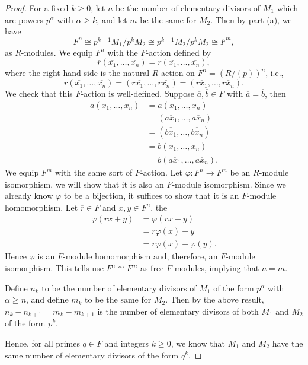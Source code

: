 \documentclass[12pt]{article}
\theoremstyle{definition}
\renewcommand{\phi}{\varphi}
\newcommand{\isom}{\cong}
\newcommand{\eqc}{\overline}
\begin{document}
\begin{proof}
    For a fixed $k \geq 0$, let $n$ be the number of elementary divisors of $M_1$ which are powers $p^\alpha$ with $\alpha \geq k$, and let $m$ be the same for $M_2$. Then by part (a), we have
    \[
        F^n \isom p^{k-1}M_1/p^kM_2 \isom p^{k-1}M_2/p^kM_2 \isom F^m,
    \]
    as $R$-modules. We equip $F^n$ with the $F$-action defined by
    \[
        \eqc{r}(\eqc{x_1}, \dots, \eqc{x_n}) = r(\eqc{x_1}, \dots, \eqc{x_n}),
    \]
    where the right-hand side is the natural $R$-action on $F^n = (R/(p))^n$, i.e.,
    \[
        r(\eqc{x_1}, \dots, \eqc{x_n})
            = (r\eqc{x_1}, \dots, r\eqc{x_n})
            = (\eqc{rx_1}, \dots, \eqc{rx_n}).
    \]
    We check that this $F$-action is well-defined. Suppose $\eqc{a}, \eqc{b} \in F$ with $\eqc{a} = \eqc{b}$, then
    \begin{align*}
        \eqc{a}(\eqc{x_1}, \dots, \eqc{x_n})
            &= a(\eqc{x_1}, \dots, \eqc{x_n}) \\
            &= (\eqc{ax_1}, \dots, \eqc{ax_n}) \\
            &= (\eqc{bx_1}, \dots, \eqc{bx_n}) \\
            &= b(\eqc{x_1}, \dots, \eqc{x_n}) \\
            &= \eqc{b}(\eqc{ax_1}, \dots, \eqc{ax_n}).
    \end{align*}
    We equip $F^m$ with the same sort of $F$-action. Let $\phi : F^n \to F^m$ be an $R$-module isomorphism, we will show that it is also an $F$-module isomorphism. Since we already know $\phi$ to be a bijection, it suffices to show that it is an $F$-module homomorphism. Let $\eqc{r} \in F$ and $x, y \in F^n$, the
    \begin{align*}
        \phi(\eqc{r}x + y)
            &= \phi(rx + y) \\
            &= r\phi(x) + y \\
            &= \eqc{r}\phi(x) + \phi(y).
    \end{align*}
    Hence $\phi$ is an $F$-module homomorphism and, therefore, an $F$-module isomorphism. This tells use $F^n \isom F^m$ as free $F$-modules, implying that $n = m$.
    
    Define $n_k$ to be the number of elementary divisors of $M_1$ of the form $p^\alpha$ with $\alpha \geq n$, and define $m_k$ to be the same for $M_2$. Then by the above result, $n_k - n_{k+1} = m_k - m_{k+1}$ is the number of elementary divisors of both $M_1$ and $M_2$ of the form $p^k$.
    
    Hence, for all primes $q \in F$ and integers $k \geq 0$, we know that $M_1$ and $M_2$ have the same number of elementary divisors of the form $q^k$. 
    
    
\end{proof}
\end{document}

